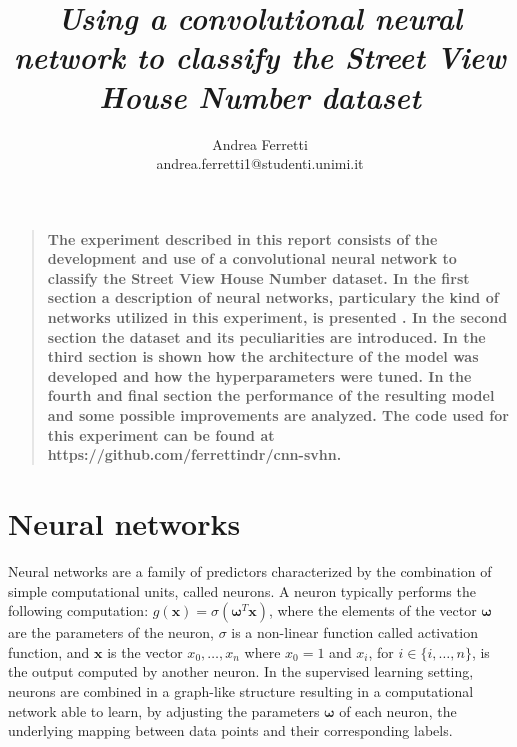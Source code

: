 \documentclass[12pt]{article}
\title{{\it Using a convolutional neural network to classify the Street View House Number dataset}}
\author
{Andrea Ferretti\\
\normalsize{andrea.ferretti1@studenti.unimi.it}
}
\date{}
\newenvironment{sciabstract}{%
\begin{quote} \bf}
{\end{quote}}
\newcommand{\vect}[1]{\boldsymbol{#1}}
\begin{document}
 


\baselineskip17pt


\maketitle 

\begin{sciabstract}
The experiment described in this report consists of the development and use of a convolutional neural network to classify the Street View House Number dataset. In the first section a description of neural networks, particulary the kind of networks utilized in this experiment,  is presented . In the second section the dataset and its peculiarities are introduced. In the third section is shown how the architecture of the model was developed and how the hyperparameters were tuned. In the fourth and final section the performance of the resulting model and some possible improvements are analyzed. The code used for this experiment can be found at https://github.com/ferrettindr/cnn-svhn.
\end{sciabstract}

\section*{Neural networks}
Neural networks are a family of predictors characterized by the combination of simple computational units, called neurons.
A neuron typically performs the following computation: $ g(\vect{x}) = \sigma(\vect{\omega}^T \vect{x}) $, where the elements of the vector $\vect{\omega}$ are the parameters of the neuron, $\sigma$ is a non-linear function called activation function, and $\vect{x}$ is the vector $x_0,\ldots,x_n $ where $ x_0 = 1$ and $x_i$, for $i \in \{i,\ldots,n\}$, is the output computed by another neuron.
In the supervised learning setting, neurons are combined in a graph-like structure resulting in a computational network able to learn, by adjusting the parameters $\vect{\omega}$ of each neuron, the underlying mapping between data points and their corresponding labels.
\end{document}
